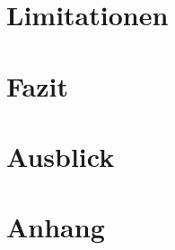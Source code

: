 \documentclass[11pt,a4paper]{article}
\begin{document}
% 




\section{Limitationen}
\section{Fazit}
\section{Ausblick}
\section{Anhang}


% 
% 

\printbibliography
\end{document}
